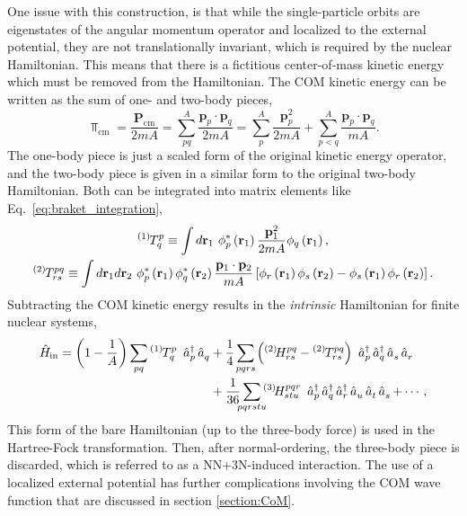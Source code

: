 \documentclass[thesis.tex]{subfiles}
\begin{document}
One issue with this construction, is that while the single-particle orbits are eigenstates of the angular momentum operator and localized to the external potential, they are not translationally invariant, which is required by the nuclear Hamiltonian.  This means that there is a fictitious center-of-mass kinetic energy which must be removed from the Hamiltonian.  The COM kinetic energy can be written as the sum of one- and two-body pieces,
\begin{equation}
  \Top_{\mathrm{cm}} = \frac{\mathbf{P}_{\mathrm{cm}}}{2mA} = \sum^{A}_{pq}\frac{\mathbf{p}_{p}\cdot\mathbf{p}_{q}}{2mA} = \sum^{A}_{p}\frac{\mathbf{p}^{2}_{p}}{2mA} + \sum^{A}_{p<q}\frac{\mathbf{p}_{p}\cdot\mathbf{p}_{q}}{mA}.
\end{equation}
The one-body piece is just a scaled form of the original kinetic energy operator, and the two-body piece is given in a similar form to the original two-body Hamiltonian.  Both can be integrated into matrix elements like Eq.\ \eqref{eq:braket_integration},
\begin{gather} \label{eq:ke_integration}
    {}^{\left(1\right)}\hspace{-1pt}T^{p}_{q} \equiv \int d\mathbf{r}_{1}\  \phi^{*}_{p}\left(\mathbf{r}_{1}\right) \frac{\mathbf{p}^{2}_{1}}{2mA} \phi_{q}\left(\mathbf{r}_{1}\right), \notag \\
    {}^{\left(2\right)}\hspace{-1pt}T^{pq}_{rs} \equiv \int d\mathbf{r}_{1} d\mathbf{r}_{2}\  \phi^{*}_{p}\left(\mathbf{r}_{1}\right)\phi^{*}_{q}\left(\mathbf{r}_{2}\right) \frac{\mathbf{p}_{1}\cdot\mathbf{p}_{2}}{mA} \left[\phi_{r}\left(\mathbf{r}_{1}\right)\phi_{s}\left(\mathbf{r}_{2}\right) - \phi_{s}\left(\mathbf{r}_{1}\right)\phi_{r}\left(\mathbf{r}_{2}\right)\right].
\end{gather}
Subtracting the COM kinetic energy results in the \textit{intrinsic} Hamiltonian for finite nuclear systems,
\begin{align} \label{eq:intrinsic_hamiltonian}
  \Ham_{\mathrm{in}} = \left(1 - \frac{1}{A}\right)\sum_{\mathclap{pq}}\KEint{1}{p}{q}\ \co{p}\ao{q} &+ \frac{1}{4}\sum_{\mathclap{pqrs}}\left(\Hint{2}{pq}{rs} - \KEint{2}{pq}{rs}\right)\ \co{p}\co{q}\ao{s}\ao{r} \notag \\
  &+ \frac{1}{36}\sum_{\mathclap{pqrstu}}\Hint{3}{pqr}{stu}\ \co{p}\co{q}\co{r}\ao{u}\ao{t}\ao{s} + \cdots,
\end{align}
This form of the bare Hamiltonian (up to the three-body force) is used in the Hartree-Fock transformation.  Then, after normal-ordering, the three-body piece is discarded, which is referred to as a NN+3N-induced interaction.  The use of a localized external potential has further complications involving the COM wave function that are discussed in section \ref{section:CoM}.
\end{document}
